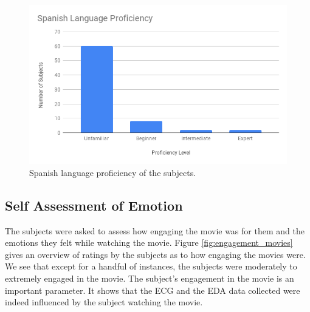 \begin{figure}
    \centering
    \includegraphics[width=140mm]{Figures/spanish_language_proficiency.png}
    \caption{Spanish language proficiency of the subjects.}
    \label{fig:spanish_language}
\end{figure}

\subsection{Self Assessment of Emotion}
The subjects were asked to assess how engaging the movie was for them and the emotions they felt while watching the movie. Figure \ref{fig:engagement_movies} gives an overview of ratings by the subjects as to how engaging the movies were. We see that except for a handful of instances, the subjects were moderately to extremely engaged in the movie. The subject's engagement in the movie is an important parameter. It shows that the ECG and the EDA data collected were indeed influenced by the subject watching the movie.
